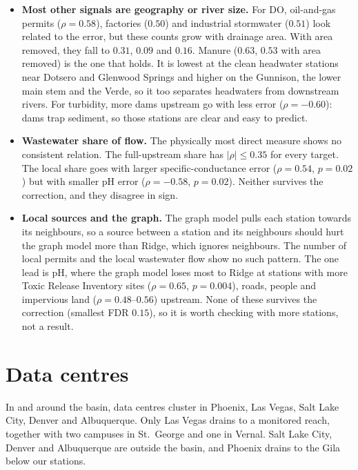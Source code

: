 \documentclass[11pt]{article}
\begin{document}
\begin{itemize}
  \item \textbf{Most other signals are geography or river size.} For DO, oil-and-gas permits
        ($\rho=0.58$), factories ($0.50$) and industrial stormwater ($0.51$) look related to the
        error, but these counts grow with drainage area. With area removed, they fall to $0.31$,
        $0.09$ and $0.16$. Manure ($0.63$, $0.53$ with area removed) is the one that holds. It
        is lowest at the clean headwater stations near Dotsero and Glenwood Springs and higher on the
        Gunnison, the lower main stem and the Verde, so it too separates headwaters from downstream
        rivers. For turbidity, more dams upstream go with
        less error ($\rho=-0.60$): dams trap sediment, so those stations are clear and easy to
        predict.
  \item \textbf{Wastewater share of flow.} The physically most direct measure shows no consistent
        relation. The full-upstream share has $|\rho|\le0.35$ for every target. The local share
        goes with larger specific-conductance error ($\rho=0.54$, $p=0.02$) but with smaller pH
        error ($\rho=-0.58$, $p=0.02$). Neither survives the correction, and they disagree in
        sign.
  \item \textbf{Local sources and the graph.} The graph model pulls each station towards its
        neighbours, so a source between a station and its neighbours should hurt the graph model
        more than Ridge, which ignores neighbours. The number of local permits and the local
        wastewater flow show no such pattern. The one lead is pH, where the graph model loses most
        to Ridge at stations with more Toxic Release Inventory sites ($\rho=0.65$, $p=0.004$),
        roads, people and impervious land ($\rho=0.48$--$0.56$) upstream. None of these survives
        the correction (smallest FDR $0.15$), so it is worth checking with more stations, not a
        result.
\end{itemize}

\section{Data centres}\label{sec:datacentres}

In and around the basin, data centres cluster in Phoenix, Las Vegas, Salt Lake City, Denver and
Albuquerque. Only Las Vegas drains to a monitored reach, together with two campuses in St.~George
and one in Vernal. Salt Lake City, Denver and Albuquerque are outside the basin, and Phoenix drains
to the Gila below our stations.
\end{document}
